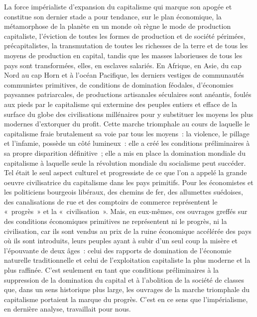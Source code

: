\documentclass[french,twoside]{book} %
\begin{document}
La force impérialiste d’expansion du capitalisme qui marque son apogée et constitue son dernier stade a pour tendance, sur le plan économique, la métamorphose de la planète en un monde où règne le mode de production capitaliste, l’éviction de toutes les formes de production et de société périmées, précapitalistes, la transmutation de toutes les richesses de la terre et de tous les moyens de production en capital, tandis que les masses laborieuses de tous les pays sont transformées, elles, en esclaves salariés. En Afrique, en Asie, du cap Nord au cap Horn et à l’océan Pacifique, les derniers vestiges de communautés communistes primitives, de conditions de domination féodales, d’économies paysannes patriarcales, de productions artisanales séculaires sont anéantis, foulés aux pieds par le capitalisme qui extermine des peuples entiers et efface de la surface du globe des civilisations millénaires pour y substituer les moyens les plus modernes d’extorquer du profit. Cette marche triomphale au cours de laquelle le capitalisme fraie brutalement sa voie par tous les moyens : la violence, le pillage et l’infamie, possède un côté lumineux : elle a créé les conditions préliminaires à sa propre disparition définitive ; elle a mis en place la domination mondiale du capitalisme à laquelle seule la révolution mondiale du socialisme peut succéder. Tel était le seul aspect culturel et progressiste de ce que l’on a appelé la grande oeuvre civilisatrice du capitalisme dans les pays primitifs. Pour les économistes et les politiciens bourgeois libéraux, des chemins de fer, des allumettes suédoises, des canalisations de rue et des comptoirs de commerce représentent le « progrès » et la « civilisation ». Mais, en eux-mêmes, ces ouvrages greffés sur des conditions économiques primitives ne représentent ni le progrès, ni la civilisation, car ils sont vendus au prix de la ruine économique accélérée des pays où ils sont introduits, leurs peuples ayant à subir d’un seul coup la misère et l’épouvante de deux âges : celui des rapports de domination de l’économie naturelle traditionnelle et celui de l’exploitation capitaliste la plus moderne et la plus raffinée. C'est seulement en tant que conditions préliminaires à la suppression de la domination du capital et à l’abolition de la société de classes que, dans un sens historique plus large, les ouvrages de la marche triomphale du capitalisme portaient la marque du progrès. C'est en ce sens que l’impérialisme, en dernière analyse, travaillait pour nous.\par
\end{document}
